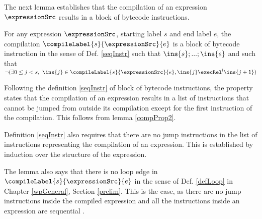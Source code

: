 The next lemma establishes that the compilation of an expression $\expressionSrc$ results in
 a block of bytecode instructions.  
\begin{compProp3}\label{compProp3}
    For any expression $\expressionSrc$, starting label $s$ and end label $e$,
    the compilation $\compileLabel{s}{\expressionSrc}{e}$ is a block of bytecode instruction in the sense of Def. \ref{seqInstr}
    such that $\ins{s};...;\ins{e}$  and such that $ \neg ( \exists 0 \le  j < s, \ \ins{j} \in \compileLabel{s}{\expressionSrc}{e}, \ins{j} \execRel^{l} \ins{j+1} )$         
\end{compProp3}

Following the definition \ref{seqInstr} of block of bytecode instructions, 
the property states that the compilation of an expression results in a list of instructions that cannot be jumped from outside its compilation 
except for the first instruction of the compilation. This follows from lemma \ref{compProp2}. 

Definition \ref{seqInstr} also requires that there are no jump instructions  in the list of instructions representing the  compilation of an expression.
This is established by induction over the structure of the expression.

The lemma also says that there is no loop edge in $\compileLabel{s}{\expressionSrc}{e}$ in the sense of Def.  \ref{defLoop} in Chapter
\ref{wpGeneral}, Section \ref{prelim}. This is the case, as there are no jump instructions inside the compiled expression  and all the instructions inside an
expression are sequential .











